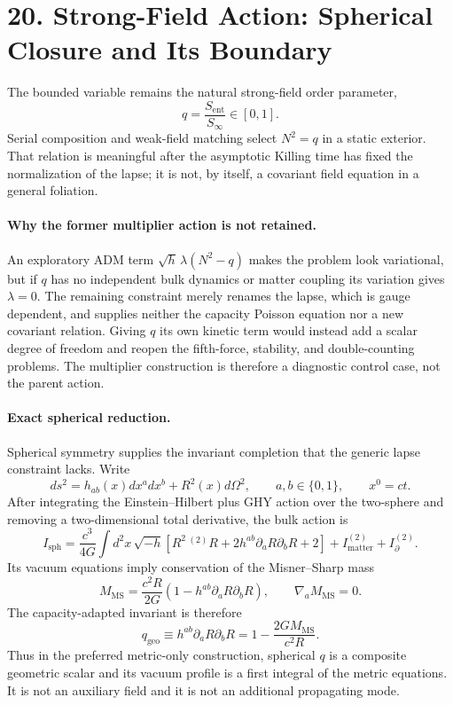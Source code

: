 \documentclass[11pt]{article}
\begin{document}
\section{20. Strong-Field Action: Spherical Closure and Its Boundary}

The bounded variable remains the natural strong-field order parameter,
\[
q=\frac{S_{\mathrm{ent}}}{S_\infty}\in[0,1].
\]
Serial composition and weak-field matching select $N^2=q$ in a static exterior. That relation is meaningful after the asymptotic Killing time has fixed the normalization of the lapse; it is not, by itself, a covariant field equation in a general foliation.

\paragraph{Why the former multiplier action is not retained.}
An exploratory ADM term $\sqrt h\,\lambda(N^2-q)$ makes the problem look variational, but if $q$ has no independent bulk dynamics or matter coupling its variation gives $\lambda=0$. The remaining constraint merely renames the lapse, which is gauge dependent, and supplies neither the capacity Poisson equation nor a new covariant relation. Giving $q$ its own kinetic term would instead add a scalar degree of freedom and reopen the fifth-force, stability, and double-counting problems. The multiplier construction is therefore a diagnostic control case, not the parent action.

\paragraph{Exact spherical reduction.}
Spherical symmetry supplies the invariant completion that the generic lapse constraint lacks. Write
\[
ds^2=h_{ab}(x)dx^adx^b+R^2(x)d\Omega^2,
\qquad a,b\in\{0,1\},
\qquad x^0=ct.
\]
After integrating the Einstein--Hilbert plus GHY action over the two-sphere and removing a two-dimensional total derivative, the bulk action is
\[
I_{\mathrm{sph}}
=\frac{c^3}{4G}\int d^2x\,\sqrt{-h}
\left[
R^2\,{}^{(2)}R+2h^{ab}\partial_aR\partial_bR+2
\right]
+I_{\mathrm{matter}}^{(2)}+I_{\partial}^{(2)}.
\]
Its vacuum equations imply conservation of the Misner--Sharp mass
\[
M_{\mathrm{MS}}
=\frac{c^2R}{2G}
\left(1-h^{ab}\partial_aR\partial_bR\right),
\qquad
\nabla_aM_{\mathrm{MS}}=0.
\]
The capacity-adapted invariant is therefore
\[
\boxed{
q_{\mathrm{geo}}
\equiv h^{ab}\partial_aR\partial_bR
=1-\frac{2GM_{\mathrm{MS}}}{c^2R}.
}
\]
Thus in the preferred metric-only construction, spherical $q$ is a composite geometric scalar and its vacuum profile is a first integral of the metric equations. It is not an auxiliary field and it is not an additional propagating mode.
\end{document}
